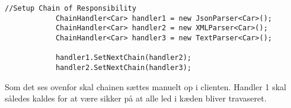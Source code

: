 \begin{lstlisting}
//Setup Chain of Responsibility
            ChainHandler<Car> handler1 = new JsonParser<Car>();
            ChainHandler<Car> handler2 = new XMLParser<Car>();
            ChainHandler<Car> handler3 = new TextParser<Car>();

            handler1.SetNextChain(handler2);
            handler2.SetNextChain(handler3);
\end{lstlisting} 
   
Som det ses ovenfor skal chainen sættes manuelt op i clienten. Handler 1 skal således kaldes for at være sikker på at alle led i kæden bliver travaseret. 


